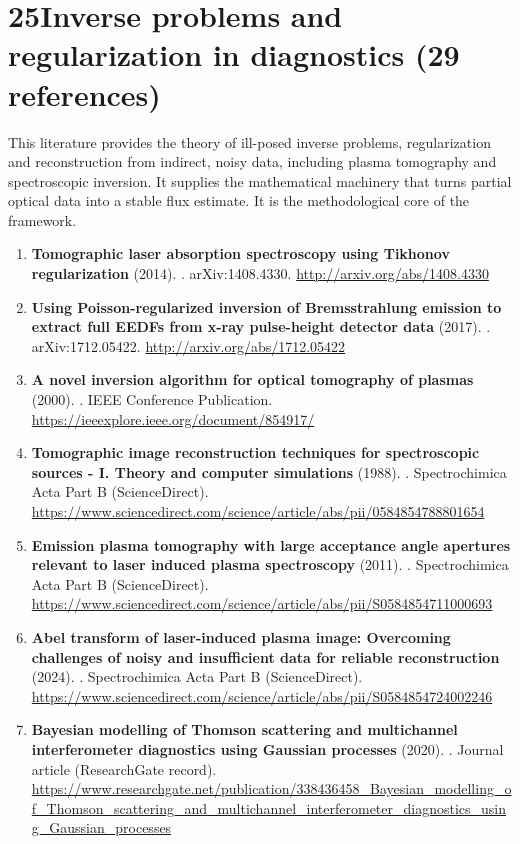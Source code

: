 \documentclass[11pt,a4paper]{article}
\begin{document}
\section*{25\quad Inverse problems and regularization in diagnostics \textnormal{(\normalsize 29 references)}}
This literature provides the theory of ill-posed inverse problems, regularization and reconstruction from indirect, noisy data, including plasma tomography and spectroscopic inversion. It supplies the mathematical machinery that turns partial optical data into a stable flux estimate. It is the methodological core of the framework.
\begin{enumerate}[leftmargin=1.4em]
\item \textbf{Tomographic laser absorption spectroscopy using Tikhonov regularization} (2014). . arXiv:1408.4330. \url{http://arxiv.org/abs/1408.4330}
\item \textbf{Using Poisson-regularized inversion of Bremsstrahlung emission to extract full EEDFs from x-ray pulse-height detector data} (2017). . arXiv:1712.05422. \url{http://arxiv.org/abs/1712.05422}
\item \textbf{A novel inversion algorithm for optical tomography of plasmas} (2000). . IEEE Conference Publication. \url{https://ieeexplore.ieee.org/document/854917/}
\item \textbf{Tomographic image reconstruction techniques for spectroscopic sources - I. Theory and computer simulations} (1988). . Spectrochimica Acta Part B (ScienceDirect). \url{https://www.sciencedirect.com/science/article/abs/pii/0584854788801654}
\item \textbf{Emission plasma tomography with large acceptance angle apertures relevant to laser induced plasma spectroscopy} (2011). . Spectrochimica Acta Part B (ScienceDirect). \url{https://www.sciencedirect.com/science/article/abs/pii/S0584854711000693}
\item \textbf{Abel transform of laser-induced plasma image: Overcoming challenges of noisy and insufficient data for reliable reconstruction} (2024). . Spectrochimica Acta Part B (ScienceDirect). \url{https://www.sciencedirect.com/science/article/abs/pii/S0584854724002246}
\item \textbf{Bayesian modelling of Thomson scattering and multichannel interferometer diagnostics using Gaussian processes} (2020). . Journal article (ResearchGate record). \url{https://www.researchgate.net/publication/338436458_Bayesian_modelling_of_Thomson_scattering_and_multichannel_interferometer_diagnostics_using_Gaussian_processes}

\end{enumerate}
\end{document}
